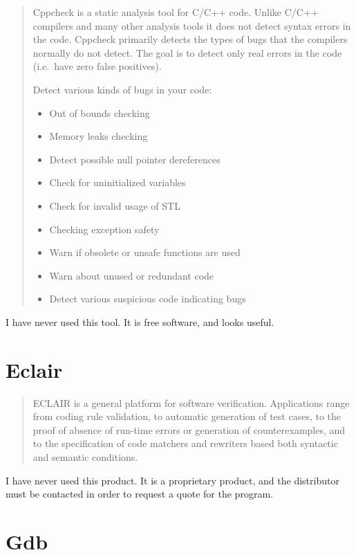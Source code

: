 \documentclass[12pt]{article}
\begin{document}
\begin{quote}
Cppcheck is a static analysis tool for C/C++ code. Unlike C/C++ compilers
and many other analysis tools it does not detect syntax errors in the
code. Cppcheck primarily detects the types of bugs that the compilers
normally do not detect. The goal is to detect only real errors in the code
(i.e.\ have zero false positives).

Detect various kinds of bugs in your code:
\begin{itemize}
    \item Out of bounds checking
    \item Memory leaks checking
    \item Detect possible null pointer dereferences
    \item Check for uninitialized variables
    \item Check for invalid usage of STL
    \item Checking exception safety
    \item Warn if obsolete or unsafe functions are used
    \item Warn about unused or redundant code
    \item Detect various suspicious code indicating bugs
\end{itemize}
\end{quote}

I have never used this tool. It is free software, and looks useful.
\cite{cppcheck}
\section{Eclair}

\begin{quote}
ECLAIR is a general platform for software verification. Applications
range from coding rule validation, to automatic generation of
test cases, to the proof of absence of run-time errors or generation
of counterexamples, and to the specification of code matchers and
rewriters based both syntactic and semantic conditions.
\end{quote}

I have never used this product. It is a proprietary product, and the
distributor must be contacted in order to request a quote for the program.
\cite{eclair}
\section{Gdb}
\end{document}
